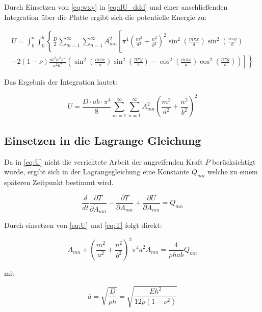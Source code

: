 Durch Einsetzen von \ref{eq:wxy} in \ref{eq:dU_ddd} und einer anschließenden Integration über die Platte ergibt sich die potentielle Energie zu:


\begin{multline}
U = \int_0^a \int_0^b \left\{
\frac{D}{2} \sum_{m = 1}^{\infty}\sum_{n = 1}^{\infty} A^2_{mn}
\left[
\pi^4 \left(\frac{m^2}{a^2} + \frac{n^2}{b^2}\right)^2
\sin^2\left(\frac{m\pi x}{a}\right) \sin^2\left(\frac{n\pi y}{b}\right)
\right.
\right. \\
\left.
\left.
-2(1-\nu) 
\frac{m^2n^2\pi^4}{a^2b^2}
\left(
\sin^2\left(\frac{m\pi x}{a}\right) 
\sin^2\left(\frac{n\pi y}{b}\right)
- 
\cos^2\left(\frac{m\pi x}{a}\right) 
\cos^2\left(\frac{n\pi y}{b}\right)
\right)
\right] 
\right\}
\end{multline}

Das Ergebnis der Integration lautet:

\begin{equation}
U = \dfrac{D \cdot a b \cdot \pi^4}{8} \sum_{m=1}^{\infty}  \sum_{n=1}^{\infty} A^2_{mn}  \left( \dfrac{m^2}{a^2} + \dfrac{n^2}{b^2}\right)^2
\label{eq:U}
\end{equation}

\subsection{Einsetzen in die Lagrange Gleichung}

Da in \ref{eq:U} nicht die verrichtete Arbeit der angreifenden Kraft $P$ berücksichtigt wurde, ergibt sich in der Lagrangegleichung eine Konstante $Q_{mn}$ welche zu einem späteren Zeitpunkt bestimmt wird.

\begin{equation}
\dfrac{d}{dt} \dfrac{\partial T}{\partial \dot{A}_{mn}} - \dfrac{\partial T}{\partial A_{mn}} + \dfrac{\partial U}{\partial A_{mn}} = Q_{mn}
\end{equation}

Durch einsetzen von \ref{eq:U} und \ref{eq:T} folgt direkt:

\begin{equation}
\ddot{A}_{mn} + \left(\dfrac{m^2}{a^2} + \dfrac{n^2}{b^2}\right)^2 \pi^4 \overline{a}^2 A_{mn} = \dfrac{4}{\rho h a b} Q_{mn}
\label{eq:lagrangeDGL}
\end{equation}

mit 

$$\overline{a} = \sqrt{\dfrac{D}{\rho h}} = \sqrt{\dfrac{E h^2}{12 \rho (1-\nu^2)}}$$


